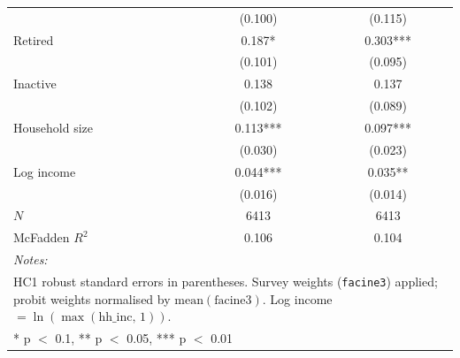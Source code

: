 \begin{table}
\begin{tabular}[t]{lcc}
 & (0.100) & (0.115)\\
\hspace{6pt} Retired & 0.187* & 0.303***\\
 & (0.101) & (0.095)\\
\hspace{6pt} Inactive & 0.138 & 0.137\\
 & (0.102) & (0.089)\\
Household size & 0.113*** & 0.097***\\
 & (0.030) & (0.023)\\
Log income & 0.044*** & 0.035**\\
 & (0.016) & (0.014)\\
\midrule
$N$ & 6413 & 6413\\
McFadden $R^2$ & 0.106 & 0.104\\
\bottomrule
\multicolumn{3}{l}{\rule{0pt}{1em}\textit{Notes: }}\\
\multicolumn{3}{l}{\rule{0pt}{1em}HC1 robust standard errors in parentheses. Survey weights (\texttt{facine3}) applied; probit weights normalised by $\text{mean}(\text{facine3})$. Log income $= \ln(\max(\text{hh\_inc},\,1))$.}\\
\multicolumn{3}{l}{\rule{0pt}{1em}* p $<$ 0.1, ** p $<$ 0.05, *** p $<$ 0.01}\\
\end{tabular}
\end{table}
